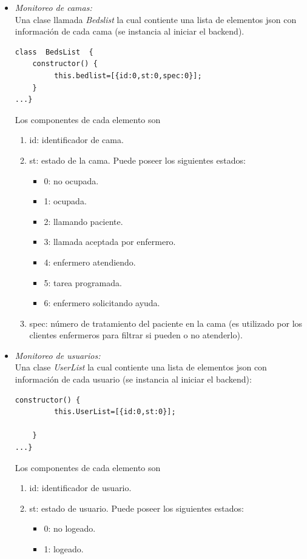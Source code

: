 \begin{itemize}

\item \textit{ Monitoreo de camas:}\\
Una  clase llamada \textit{Bedslist} la cual contiente una lista de elementos json con información de cada cama (se instancia al iniciar el backend).

\begin{lstlisting}[caption=  Clase Bedlist]
class  BedsList  {    
    constructor() {
         this.bedlist=[{id:0,st:0,spec:0}];                        
    }
...}
\end{lstlisting}

Los componentes de cada elemento son 
\begin{enumerate}
\item id: identificador de cama.
\item st: estado de la cama. Puede poseer los siguientes estados: 
\begin{itemize}
\item 0: no ocupada.
\item 1: ocupada.
\item 2: llamando paciente.
\item 3: llamada aceptada por enfermero.
\item 4: enfermero atendiendo.
\item 5: tarea programada.
\item 6: enfermero solicitando ayuda.
\end{itemize}
\item spec: número de tratamiento del paciente en la cama (es utilizado por los clientes enfermeros para filtrar si pueden o no atenderlo).
\end{enumerate}

\pagebreak
\item \textit{ Monitoreo de usuarios:}\\
Una clase \textit{UserList} la cual contiente una lista de elementos json con información de cada usuario (se instancia al iniciar el backend):

\begin{lstlisting}[caption=  Clase Userlist]
constructor() {
         this.UserList=[{id:0,st:0}];                
        
    }
...}
\end{lstlisting}

Los componentes de cada elemento son 
	\begin{enumerate}
		\item id: identificador de usuario.
		\item st: estado de usuario. Puede poseer los siguientes estados: 
			\begin{itemize}
				\item 0: no logeado.
				\item 1: logeado.
			\end{itemize}
	\end{enumerate}





\end{itemize}
